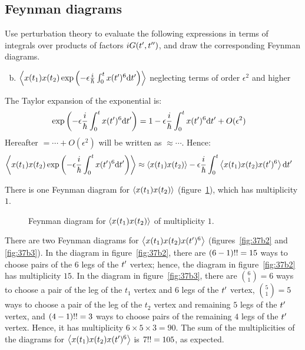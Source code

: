 \subsection{Feynman diagrams}

Use perturbation theory to evaluate the following expressions in terms of
integrals over products of factors $iG({t^{\prime}}, {t^{\prime\prime}})$, and draw the corresponding
Feynman diagrams.

\begin{enumerate}[(a)]
  \setcounter{enumi}{1}
  \item $\left\langle{x(t_1) x(t_2) \exp\left(-\epsilon\frac{i}{\hbar}\int_0^t x({t^{\prime}})^6 \text{d}{}{{t^{\prime}}}\right)}\right\rangle$
        neglecting terms of order $\epsilon^2$ and higher
\end{enumerate}

The Taylor expansion of the exponential is:
\begin{align*}
  \exp\left(-\epsilon\frac{i}{\hbar}\int_0^t x({t^{\prime}})^6 \text{d}{}{{t^{\prime}}} \right)
   & =
  1 - \epsilon\frac{i}{\hbar}\int_0^t x({t^{\prime}})^6 \text{d}{}{{t^{\prime}}} + O(\epsilon^2)
\end{align*}
Hereafter $=\cdots + O(\epsilon^2)$ will be written as $\approx\cdots$.
Hence:
\begin{align*}
  \left\langle{x(t_1) x(t_2) \exp\left(-\epsilon\frac{i}{\hbar}\int_0^t x({t^{\prime}})^6 \text{d}{}{{t^{\prime}}}\right)}\right\rangle
   & \approx
  \left\langle{x(t_1) x(t_2)}\right\rangle - \epsilon\frac{i}{\hbar}\int_0^t \left\langle{x(t_1) x(t_2) x({t^{\prime}})^6}\right\rangle \text{d}{}{{t^{\prime}}}
\end{align*}

There is one Feynman diagram for $\left\langle{x(t_1) x(t_2)}\right\rangle$ (figure~\ref{fig:37b1}),
which has multiplicity $1$.
\begin{figure}[ht!]
  \centering
  \caption{Feynman diagram for $\left\langle{x(t_1) x(t_2)}\right\rangle$ of multiplicity $1$.}
  \label{fig:37b1}
\end{figure}

There are two Feynman diagrams for $\left\langle{x(t_1) x(t_2) x({t^{\prime}})^6}\right\rangle$
(figures~\ref{fig:37b2} and \ref{fig:37b3}).
In the diagram in figure~\ref{fig:37b2}, there are $(6 - 1){!!} = 15$
ways to choose pairs of the $6$ legs of the ${t^{\prime}}$ vertex; hence, the diagram in
figure~\ref{fig:37b2} has multiplicity $15$.
In the diagram in figure~\ref{fig:37b3}, there are $\binom{6}{1} = 6$ ways to
choose a pair of the leg of the $t_1$ vertex and $6$ legs of the ${t^{\prime}}$ vertex,
$\binom{5}{1} = 5$ ways to choose a pair of the leg of the $t_2$ vertex and
remaining $5$ legs of the ${t^{\prime}}$ vertex, and $(4 - 1){!!} = 3$ ways to
choose pairs of the remaining $4$ legs of the ${t^{\prime}}$ vertex.
Hence, it has multiplicity $6 \times 5 \times 3 = 90$.
The sum of the multiplicities of the diagrams for $\left\langle{x(t_1) x(t_2)
    x({t^{\prime}})^6}\right\rangle$ is $7{!!} = 105$, as expected.

